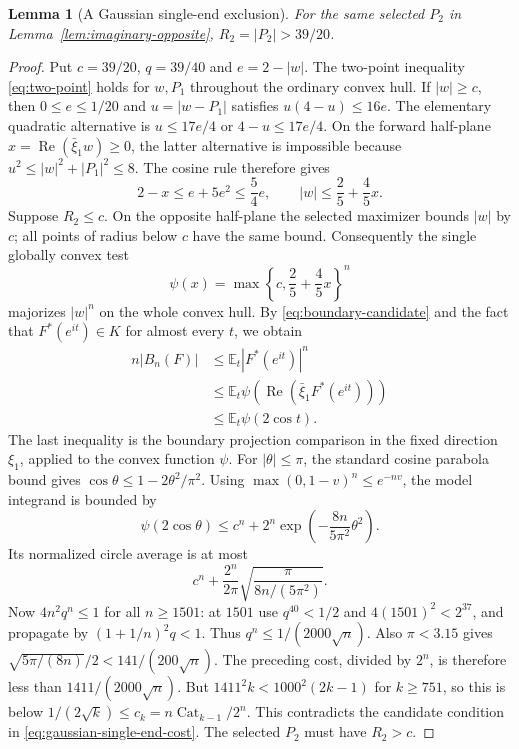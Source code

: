 \documentclass[11pt]{article}
\newtheorem{lemma}[theorem]{Lemma}
\newcommand{\E}{\mathbb E}
\newcommand{\Cat}{\operatorname{Cat}}
\begin{document}
	\begin{lemma}[A Gaussian single-end exclusion]\label{lem:second-radius-195}
		For the same selected $P_2$ in Lemma~\ref{lem:imaginary-opposite},
		$R_2=|P_2|>39/20$.
	\end{lemma}
	\begin{proof}
		Put $c=39/20$, $q=39/40$ and $e=2-|w|$.  The two-point inequality
		\eqref{eq:two-point} holds for $w,P_1$ throughout the ordinary convex
		hull.  If $|w|\geq c$, then $0\leq e\leq1/20$ and
		$u=|w-P_1|$ satisfies $u(4-u)\leq16e$.
		The elementary quadratic alternative is
		$u\leq17e/4$ or $4-u\leq17e/4$.  On the forward half-plane
		$x=\operatorname{Re}(\bar\xi_1w)\geq0$, the latter alternative is
		impossible because $u^2\leq|w|^2+|P_1|^2\leq8$.  The cosine rule
		therefore gives
		\[
		2-x\leq e+5e^2\leq\frac54e,
		\qquad |w|\leq\frac25+\frac45x.
		\]
		Suppose $R_2\leq c$.  On the opposite half-plane the selected
		maximizer bounds $|w|$ by $c$; all points of radius below $c$ have the
		same bound.  Consequently the single globally convex test
		\[
		\psi(x)=\max\!\left\{c,\frac25+\frac45x\right\}^{n}
		\]
		majorizes $|w|^n$ on the whole convex hull. By \eqref{eq:boundary-candidate} and the fact that
		$F^*(e^{it})\in K$ for almost every $t$, we obtain
		\begin{equation}\label{eq:gaussian-single-end-cost}
			\begin{aligned}
				n|B_n(F)|
				&\leq \E_t |F^*(e^{it})|^n \\
				&\leq \E_t
				\psi\!\left(\operatorname{Re}(\bar\xi_1 F^*(e^{it}))\right) \\
				&\leq \E_t \psi(2\cos t).
			\end{aligned}
		\end{equation}
		The last inequality is the boundary projection comparison
		in the fixed direction $\xi_1$, applied to the convex function $\psi$.
		For $|\theta|\leq\pi$, the standard cosine parabola bound gives
		$\cos\theta\leq1-2\theta^2/\pi^2$.  Using
		$\max(0,1-v)^n\leq e^{-nv}$, the model integrand is bounded by
		\[
		\psi(2\cos\theta)
		\leq c^n+2^n\exp\!\left(-\frac{8n}{5\pi^2}\theta^2\right).
		\]
		Its normalized circle average is at most
		\[
		c^n+\frac{2^n}{2\pi}
		\sqrt{\frac{\pi}{8n/(5\pi^2)}}.
		\]
		Now $4n^2q^n\leq1$ for all $n\geq1501$: at $1501$ use
		$q^{40}<1/2$ and $4(1501)^2<2^{37}$, and propagate by
		$(1+1/n)^2q<1$.  Thus $q^n\leq1/(2000\sqrt n)$.
		Also $\pi<3.15$ gives
		$\sqrt{5\pi/(8n)}/2<141/(200\sqrt n)$.  The preceding cost,
		divided by $2^n$, is therefore less than
		$1411/(2000\sqrt n)$.  But
		$1411^2k<1000^2(2k-1)$ for $k\geq751$, so this is below
		$1/(2\sqrt k)\leq c_k=n\Cat_{k-1}/2^n$.
		This contradicts the candidate condition in
		\eqref{eq:gaussian-single-end-cost}.  The selected $P_2$ must have
		$R_2>c$.
	\end{proof}
	
\end{document}
